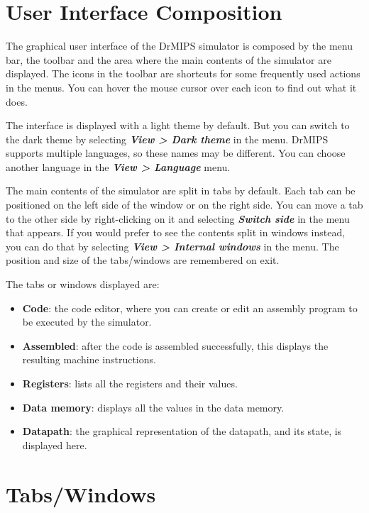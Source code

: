\documentclass[11pt,a4paper,twoside,titlepage]{article}
\author{Bruno Nova}
\title{\Title}
\newcommand{\menupath}[1]{\textbf{\emph{#1}}}
\begin{document}
\maketitle
\tableofcontents
\newpage

\section{User Interface Composition}

The graphical user interface of the DrMIPS simulator is composed by the menu 
bar, the toolbar and the area where the main contents of the simulator 
are displayed.
The icons in the toolbar are shortcuts for some frequently used actions in the
menus. You can hover the mouse cursor over each icon to find out what it does.

The interface is displayed with a light theme by default. But you can switch
to the dark theme by selecting \menupath{View > Dark theme} in the menu.
DrMIPS supports multiple languages, so these names may be different.
You can choose another language in the \menupath{View > Language} menu.

The main contents of the simulator are split in tabs by default. Each tab can
be positioned on the left side of the window or on the right side. 
You can move a tab to the other side by right-clicking on it and selecting 
\menupath{Switch side} in the menu that appears.
If you would prefer to see the contents split in windows instead, you can do
that by selecting \menupath{View > Internal windows} in the menu.
The position and size of the tabs/windows are remembered on exit.

The tabs or windows displayed are:
\begin{itemize}
	\item \textbf{Code}: the code editor, where you can create or edit an
		assembly program to be executed by the simulator.
	\item \textbf{Assembled}: after the code is assembled successfully, this
		displays the resulting machine instructions.
	\item \textbf{Registers}: lists all the registers and their values.
	\item \textbf{Data memory}: displays all the values in the data memory.
	\item \textbf{Datapath}: the graphical representation of the datapath,
		and its state, is displayed here.
\end{itemize}


\section{Tabs/Windows}
\end{document}
